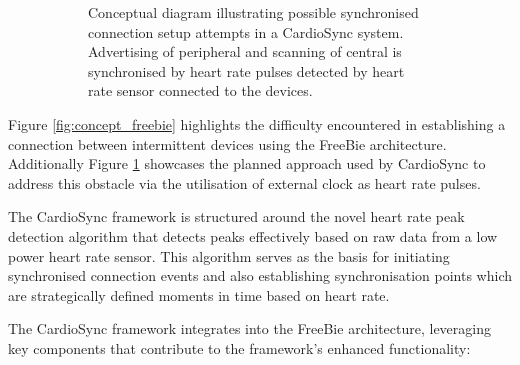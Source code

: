 \begin{figure}[t]
\begin{subfigure}{1\linewidth}
        \caption{Conceptual diagram illustrating possible synchronised connection setup attempts in a CardioSync system. Advertising of peripheral and scanning of central is synchronised by heart rate pulses detected by heart rate sensor connected to the devices.}
        \label{fig:concept_cardiosync}
    \end{subfigure}
    \caption{}
    \label{fig:freebie_vs_cardiosync}
\end{figure}
\clearpage

\noindent Figure \ref{fig:concept_freebie} highlights the difficulty encountered in establishing a connection between intermittent devices using the FreeBie architecture. Additionally Figure 
\ref{fig:concept_cardiosync} showcases the planned approach used by CardioSync to address this obstacle via the utilisation of external clock as heart rate pulses.
\vspace{1\baselineskip}

\noindent The CardioSync framework is structured around the novel heart rate peak detection algorithm that detects peaks effectively based on raw data from a low power heart rate sensor. This algorithm serves as the basis for initiating synchronised connection events and also establishing synchronisation points which are strategically defined moments in time based on heart rate.
\vspace{1\baselineskip}

\noindent The CardioSync framework integrates into the FreeBie architecture, leveraging key components that contribute to the framework's enhanced functionality:

